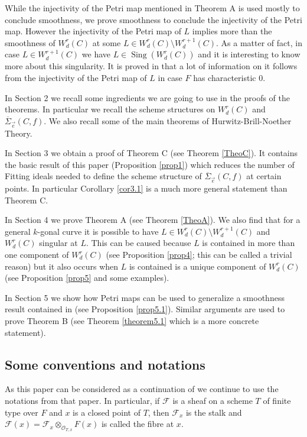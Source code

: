 \documentclass{article}
\DeclareMathOperator{\Sing}{Sing}
\theoremstyle{definition}
\theoremstyle{remark}
\begin{document}
While the injectivity of the Petri map mentioned in Theorem A is used mostly to conclude smoothness, we prove smoothness to conclude the injectivity of the Petri map.
However the injectivity of the Petri map of $L$ implies more than the smoothness of $W^r_d(C)$ at some $L \in W^r_d(C) \setminus W^{r+1}_d(C)$.
As a matter of fact, in case $L\in W^{r+1}_d(C)$ we have $L \in \Sing (W^r_d(C))$ and it is interesting to know more about this singularity.
It is proved in \cite{ref16} that a lot of information on it follows from the injectivity of the Petri map of $L$ in case $F$ has characteristic 0.

In Section 2 we recall some ingredients we are going to use in the proofs of the theorems.
In particular we recall the scheme structures on $W^r_d(C)$ and $\overline {\Sigma}_{\overrightarrow {e}}(C,f)$.
We also recall some of the main theorems of Hurwitz-Brill-Noether Theory.

In Section 3 we obtain a proof of Theorem C (see Theorem \ref{TheoC}).
It contains the basic result of this paper (Proposition \ref{prop1}) which reduces the number of Fitting ideals needed to define the scheme structure of $\overline{\Sigma}_{\overrightarrow {e}}(C,f)$ at certain points.
In particular Corollary  \ref{cor3.1} is a much more general statement than Theorem C.

In Section 4 we prove Theorem A (see Theorem \ref{TheoA}).
We also find that for a general $k$-gonal curve it is possible to have $L \in W^r_d(C) \setminus W^{r+1}_d(C)$ and $W^r_d(C)$ singular at $L$.
This can be caused because $L$ is contained in more than one component of $W^r_d(C)$ (see Proposition \ref{prop4}; this can be called a trivial reason) but it also occurs when $L$ is contained is a unique component of $W^r_d(C)$ (see Proposition \ref{prop5} and some examples).

In Section 5 we show how Petri maps can be used to generalize a smoothness result contained in \cite {ref6} (see Proposition \ref{prop5.1}).
Similar arguments are used to prove Theorem B (see Theorem \ref{theorem5.1} which is a more concrete statement).

\subsection{Some conventions and notations}

As this paper can be considered as a continuation of \cite{ref2} we continue to use the notations from that paper.
In particular, if $\mathcal{F}$ is a sheaf on a scheme $T$ of finite type over $F$ and $x$ is a closed point of $T$, then $\mathcal{F}_x$ is the stalk and $\mathcal{F}(x)=\mathcal{F}_x \otimes _{\mathcal{O}_{T,x}} F(x)$ is called the fibre at $x$.
\end{document}
